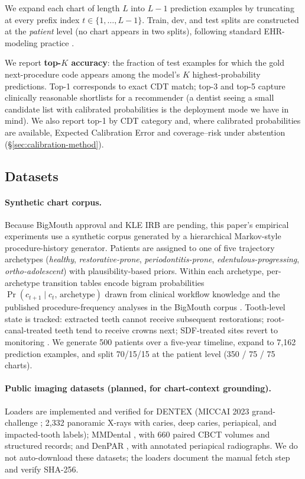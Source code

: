 \documentclass[preprint,authoryear,1p,12pt]{elsarticle}
\begin{document}
We expand each chart of length \(L\) into \(L-1\) prediction examples by
truncating at every prefix index \(t \in \{1, \dots, L-1\}\). Train, dev,
and test splits are constructed at the \emph{patient} level (no chart
appears in two splits), following standard EHR-modeling practice
\citep{rajkomar2018scalable,park2024review}.

We report \textbf{top-$K$ accuracy}: the fraction of test examples for
which the gold next-procedure code appears among the model's $K$
highest-probability predictions. Top-1 corresponds to exact CDT match;
top-3 and top-5 capture clinically reasonable shortlists for a
recommender (a dentist seeing a small candidate list with calibrated
probabilities is the deployment mode we have in mind). We also report
top-1 by CDT category and, where calibrated probabilities are available,
Expected Calibration Error and coverage--risk under abstention
(\S\ref{sec:calibration-method}).

\subsection{Datasets}
\label{sec:data}

\paragraph{Synthetic chart corpus.} Because BigMouth approval and KLE
IRB are pending, this paper's empirical experiments use a synthetic
corpus generated by a hierarchical Markov-style procedure-history
generator. Patients are assigned to one of five trajectory archetypes
(\emph{healthy}, \emph{restorative-prone}, \emph{periodontitis-prone},
\emph{edentulous-progressing}, \emph{ortho-adolescent}) with
plausibility-based priors. Within each archetype, per-archetype
transition tables encode bigram probabilities
\(\Pr(c_{t+1} \mid c_t,\, \text{archetype})\) drawn from clinical
workflow knowledge and the published procedure-frequency analyses in the
BigMouth corpus \citep{walji2014bigmouth,walji2022bigmouth}. Tooth-level
state is tracked: extracted teeth cannot receive subsequent restorations;
root-canal-treated teeth tend to receive crowns next; SDF-treated
sites revert to monitoring \citep{slayton2018evidence,seifo2020sdf}. We
generate 500 patients over a five-year timeline, expand to 7{,}162
prediction examples, and split 70/15/15 at the patient level (350 / 75
/ 75 charts).

\paragraph{Public imaging datasets (planned, for chart-context grounding).}
Loaders are implemented and verified for DENTEX (MICCAI 2023
grand-challenge \citep{dentex2023}; 2{,}332 panoramic X-rays with
caries, deep caries, periapical, and impacted-tooth labels); MMDental
\citep{mmdental2025}, with 660 paired CBCT volumes and structured
records; and DenPAR \citep{denpar2025}, with annotated periapical
radiographs. We do not auto-download these datasets; the loaders document
the manual fetch step and verify SHA-256.
\end{document}
